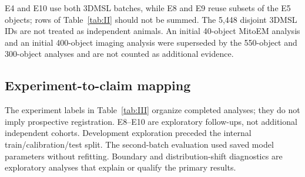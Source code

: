 \documentclass[journal]{IEEEtran}
\begin{document}
E4 and E10 use both 3DMSL batches, while E8 and E9 reuse subsets of the E5 objects; rows of Table~\ref{tab:II} should not be summed. The 5,448 disjoint 3DMSL IDs are not treated as independent animals. An initial 40-object MitoEM analysis and an initial 400-object imaging analysis were superseded by the 550-object and 300-object analyses and are not counted as additional evidence.

\subsection{Experiment-to-claim mapping}

The experiment labels in Table~\ref{tab:III} organize completed analyses; they do not imply prospective registration. E8--E10 are exploratory follow-ups, not additional independent cohorts. Development exploration preceded the internal train/calibration/test split. The second-batch evaluation used saved model parameters without refitting. Boundary and distribution-shift diagnostics are exploratory analyses that explain or qualify the primary results.
\end{document}
